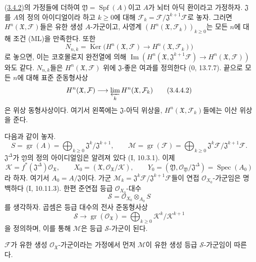 \begin{corollary}[3.4.4]
\label{III.3.4.4-fr}
(\hyperref[III.3.4.2-fr]{3.4.2})의 가정들에 더하여
$\mathfrak Y=\operatorname{Spf}(A)$이고 $A$가 뇌터 아딕 환이라고
가정하자. $\mathfrak J$를 $A$의 정의 아이디얼이라 하고 $k\geq0$에
대해 $\mathcal F_k=\mathcal F/\mathfrak J^{k+1}\mathcal F$로 놓자.
그러면 $H^n(\mathfrak X,\mathcal F)$들은 유한 생성 $A$-가군이고,
사영계 $(H^n(\mathfrak X,\mathcal F_k))_{k\geq0}$는 모든 $n$에 대해
조건 (ML)을 만족한다. 또한
\[
N_{n,k}=\operatorname{Ker}\bigl(H^n(\mathfrak X,\mathcal F)
\longrightarrow H^n(\mathfrak X,\mathcal F_k)\bigr)
\tag{3.4.4.1}\label{III.3.4.4.1-fr}
\]
로 놓으면, 이는 코호몰로지 완전열에 의해
$\operatorname{Im}(H^n(\mathfrak X,\mathfrak J^{k+1}\mathcal F)
\to H^n(\mathfrak X,\mathcal F))$와도 같다. $N_{n,k}$들은
$H^n(\mathfrak X,\mathcal F)$ 위에 $\mathfrak J$-좋은 여과를 정의한다
(0, 13.7.7). 끝으로 모든 $n$에 대해 표준 준동형사상
\[
H^n(\mathfrak X,\mathcal F)
\longrightarrow\varprojlim_kH^n(\mathfrak X,\mathcal F_k)
\tag{3.4.4.2}\label{III.3.4.4.2-fr}
\]
은 위상 동형사상이다. 여기서 왼쪽에는 $\mathfrak J$-아딕 위상을,
$H^n(\mathfrak X,\mathcal F_k)$들에는 이산 위상을 준다.
\end{corollary}

다음과 같이 놓자.
\[
S=\operatorname{gr}(A)=\bigoplus_{k\geq0}
\mathfrak J^k/\mathfrak J^{k+1},\qquad
\mathcal M=\operatorname{gr}(\mathcal F)=\bigoplus_{k\geq0}
\mathfrak J^k\mathcal F/\mathfrak J^{k+1}\mathcal F.
\tag{3.4.4.3}\label{III.3.4.4.3-fr}
\]
$\mathfrak J^\Delta$가 $\mathfrak Y$의 정의 아이디얼임은 알려져 있다
(I, 10.3.1). 이제
\[
\mathcal K=f^*(\mathfrak J^\Delta)\mathcal O_{\mathfrak X},\qquad
X_0=(\mathfrak X,\mathcal O_{\mathfrak X}/\mathcal K),\qquad
Y_0=(\mathfrak Y,\mathcal O_{\mathfrak Y}/\mathfrak J^\Delta)
=\operatorname{Spec}(A_0)
\]
라 하자. 여기서 $A_0=A/\mathfrak J$이다. 가군
$\mathcal M_k=\mathfrak J^k\mathcal F/\mathfrak J^{k+1}\mathcal F$들이
연접 $\mathcal O_{X_0}$-가군임은 명백하다 (I, 10.11.3). 한편 준연접
등급 $\mathcal O_{X_0}$-대수
\[
\mathcal S=\mathcal O_{X_0}\otimes_{A_0}S
\tag{3.4.4.4}\label{III.3.4.4.4-fr}
\]
를 생각하자. 곱셈은 등급 대수의 전사 준동형사상
\[
\mathcal S\longrightarrow
\operatorname{gr}(\mathcal O_{\mathfrak X})
=\bigoplus_{k\geq0}\mathcal K^k/\mathcal K^{k+1}
\]
을 정의하며, 이를 통해 $\mathcal M$은 등급 $\mathcal S$-가군이 된다.

$\mathcal F$가 유한 생성 $\mathcal O_{\mathfrak X}$-가군이라는 가정에서
먼저 $\mathcal M$이 유한 생성 등급 $\mathcal S$-가군임이 따른다.

